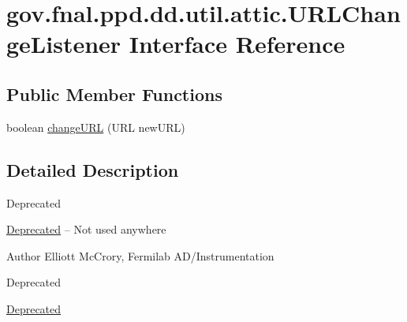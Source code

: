 \hypertarget{interfacegov_1_1fnal_1_1ppd_1_1dd_1_1util_1_1attic_1_1URLChangeListener}{\section{gov.\-fnal.\-ppd.\-dd.\-util.\-attic.\-U\-R\-L\-Change\-Listener Interface Reference}
\label{interfacegov_1_1fnal_1_1ppd_1_1dd_1_1util_1_1attic_1_1URLChangeListener}
}
\subsection*{Public Member Functions}
\begin{DoxyCompactItemize}
\item 
boolean \hyperlink{interfacegov_1_1fnal_1_1ppd_1_1dd_1_1util_1_1attic_1_1URLChangeListener_aeaabe5ec3769c3a2e44e8c713b983a55}{change\-U\-R\-L} (U\-R\-L new\-U\-R\-L)
\end{DoxyCompactItemize}


\subsection{Detailed Description}
\begin{DoxyRefDesc}{Deprecated}
\item[\hyperlink{deprecated__deprecated000020}{Deprecated}]-- Not used anywhere\end{DoxyRefDesc}


\begin{DoxyAuthor}{Author}
Elliott Mc\-Crory, Fermilab A\-D/\-Instrumentation 
\end{DoxyAuthor}
\begin{DoxyRefDesc}{Deprecated}
\item[\hyperlink{deprecated__deprecated000021}{Deprecated}]\end{DoxyRefDesc}


